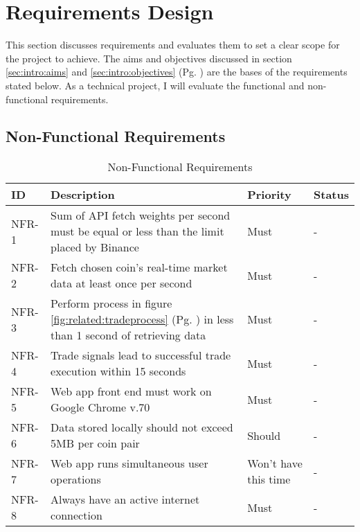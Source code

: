 %
\chapter{Requirements Design}
\label{sec:requirements}


This section discusses requirements and evaluates them to set a clear scope for the project to achieve. The aims and objectives discussed in section \ref{sec:intro:aims} and \ref{sec:intro:objectives} (Pg. \pageref{sec:intro}) are the bases of the requirements stated below. As a technical project, I will evaluate the functional and non-functional requirements.



\section{Non-Functional Requirements}
\label{sec:requirements:non_func}


\begin{table}[htb!]
\caption{Non-Functional Requirements}
\label{table:requirements:non_func}
\centering
\begin{tabular}{|l|p{}|p{}|l|}
\hline
\textbf{ID} & \textbf{Description} & \textbf{Priority} & \textbf{Status} \\ \hline\hline
NFR-1 & Sum of API fetch weights per second must be equal or less than the limit placed by Binance & Must & - \\ \hline
NFR-2 & Fetch chosen coin's real-time market data at least once per second & Must & - \\ \hline
NFR-3 & Perform process in figure \ref{fig:related:tradeprocess} (Pg. \pageref{fig:related:tradeprocess}) in less than 1 second of retrieving data & Must & - \\ \hline
NFR-4 & Trade signals lead to successful trade execution within 15 seconds & Must & - \\\hline
NFR-5 & Web app front end must work on Google Chrome v.70 & Must & - \\\hline
NFR-6 & Data stored locally should not exceed 5MB per coin pair & Should & - \\ \hline
NFR-7 & Web app runs simultaneous user operations & Won't have this time & - \\\hline
NFR-8 & Always have an active internet connection & Must & - \\\hline
\end{tabular}
\end{table}

